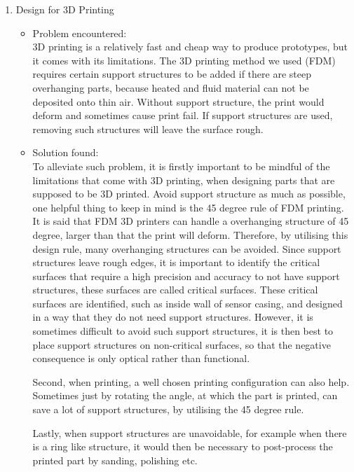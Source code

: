 \begin{enumerate}
\begin{itemize}
  \end{itemize}
  \item Design for 3D Printing
  \begin{itemize}
      \item Problem encountered:\\
      3D printing is a relatively fast and cheap way to produce prototypes, but it comes with its limitations. The 3D printing method we used (FDM) requires certain support structures to be added if there are steep overhanging parts, because heated and fluid material can not be deposited onto thin air. Without support structure, the print would deform and sometimes cause print fail. If support structures are used, removing such structures will leave the surface rough.
      \item Solution found:\\
      To alleviate such problem, it is firstly important to be mindful of the limitations that come with 3D printing, when designing parts that are supposed to be 3D printed. Avoid support structure as much as possible, one helpful thing to keep in mind is the 45 degree rule of FDM printing. It is said that FDM 3D printers can handle a overhanging structure of 45 degree, larger than that the print will deform. Therefore, by utilising this design rule, many overhanging structures can be avoided. Since support structures leave rough edges, it is important to identify the critical surfaces that require a high precision and accuracy to not have support structures, these surfaces are called critical surfaces. These critical surfaces are identified, such as inside wall of sensor casing, and designed in a way that they do not need support structures. However, it is sometimes difficult to avoid such support structures, it is then best to place support structures on non-critical surfaces, so that the negative consequence is only optical rather than functional.
      
      Second, when printing, a well chosen printing configuration can also help. Sometimes just by rotating the angle, at which the part is printed, can save a lot of support structures, by utilising the 45 degree rule.
      
      Lastly, when support structures are unavoidable, for example when there is a ring like structure, it would then be necessary to post-process the printed part by sanding, polishing etc.
  \end{itemize}
\end{enumerate}